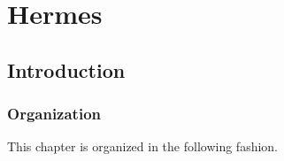 
\chapter{Hermes}
\label{ch:hermes}


\section{Introduction}
\label{sec:hermes:intro}

\subsection{Organization}
\label{subsec:hermes:org}

This chapter is organized in the following fashion.
